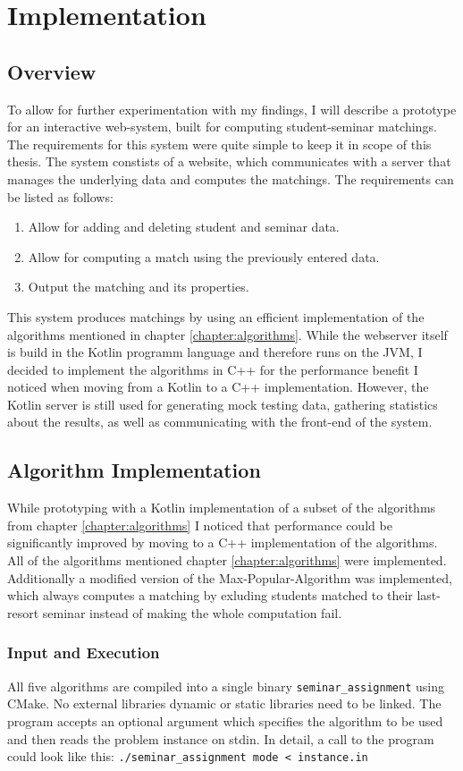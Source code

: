\section{Implementation}

\subsection{Overview}
To allow for further experimentation with my findings, I will describe a prototype for an interactive web-system, built for computing student-seminar matchings. The requirements for this system were quite simple to keep it in scope of this thesis. The system constists of a website, which communicates with a server that manages the underlying data and computes the matchings. The requirements can be listed as follows:
\begin{enumerate}
    \item Allow for adding and deleting student and seminar data.
    \item Allow for computing a match using the previously entered data.
    \item Output the matching and its properties.
\end{enumerate}
This system produces matchings by using an efficient implementation of the algorithms mentioned in chapter \ref{chapter:algorithms}. While the webserver itself is build in the Kotlin programm language and therefore runs on the JVM, I decided to implement the algorithms in C++ for the performance benefit I noticed when moving from a Kotlin to a C++ implementation. However, the Kotlin server is still used for generating mock testing data, gathering statistics about the results, as well as communicating with the front-end of the system.

\subsection{Algorithm Implementation}
While prototyping with a Kotlin implementation of a subset of the algorithms from chapter \ref{chapter:algorithms} I noticed that performance could be significantly improved by moving to a C++ implementation of the algorithms. All of the algorithms mentioned chapter \ref{chapter:algorithms} were implemented. Additionally a modified version of the Max-Popular-Algorithm was implemented, which always computes a matching by exluding students matched to their last-resort seminar instead of making the whole computation fail.

\subsubsection{Input and Execution}
All five algorithms are compiled into a single binary \lstinline{seminar_assignment} using CMake. No external libraries dynamic or static libraries need to be linked. The program accepts an optional argument which specifies the algorithm to be used and then reads the problem instance on stdin. In detail, a call to the program could look like this: \lstinline{./seminar_assignment mode < instance.in} 

